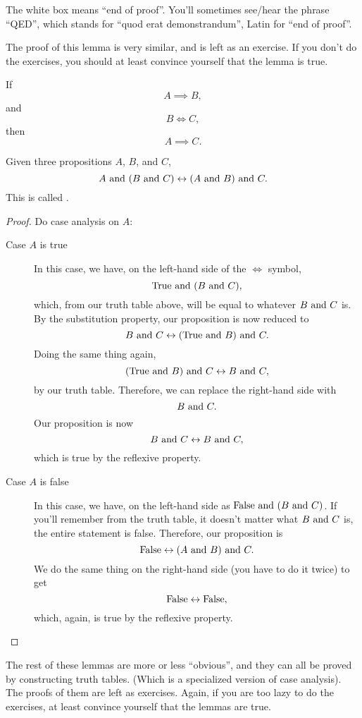 The white box means ``end of proof''. You'll sometimes see/hear the
phrase ``QED'', which stands for ``quod erat demonstrandum'', Latin
for ``end of proof''.

The proof of this lemma is very similar, and is left as an
exercise. If you don't do the exercises, you should at least convince
yourself that the lemma is true.

\begin{lemma}
  \label{conclusion-substitution}
  If $$A \implies B,$$ and $$B \iff C,$$ then $$A \implies C.$$
\end{lemma}

\begin{lemma}
  Given three propositions $A$, $B$, and $C$,
  $$A \text{ and } (B \text{ and } C) \leftrightarrow (A \text{ and } B) \text{ and } C.$$ This is called
  .
\end{lemma}

\begin{proof}
  Do case analysis on $A$:

  \begin{description}
  \item[Case $A$ is true] In this case, we have, on the left-hand side
    of the $\iff$ symbol, $$\text{True} \text{ and } (B \text{ and } C),$$ which, from our
    truth table above, will be equal to whatever $B \text{ and } C$ is. By
    the substitution property, our proposition is now reduced to
    $$B \text{ and } C \leftrightarrow (\text{True} \text{ and } B) \text{ and } C.$$ Doing the same thing
    again, $$(\text{True} \text{ and } B) \text{ and } C \leftrightarrow B \text{ and } C,$$ by our truth
    table. Therefore, we can replace the right-hand side with
    $$B \text{ and } C.$$ Our proposition is now
    $$B \text{ and } C \leftrightarrow B \text{ and } C,$$ which is true by the reflexive
    property.
  \item[Case $A$ is false] In this case, we have, on the left-hand
    side as $\text{False} \text{ and } (B \text{ and } C)$. If you'll remember from the
    truth table, it doesn't matter what $B \text{ and } C$ is, the entire
    statement is false. Therefore, our proposition is
    $$\text{False} \leftrightarrow (A \text{ and } B) \text{ and } C.$$ We do the same thing on the
    right-hand side (you have to do it twice) to get
    $$\text{False} \leftrightarrow \text{False},$$ which, again, is true by the reflexive property.
  \end{description}
\end{proof}

The rest of these lemmas are more or less ``obvious'', and they can
all be proved by constructing truth tables. (Which is a specialized
version of case analysis). The proofs of them are left as
exercises. Again, if you are too lazy to do the exercises, at least
convince yourself that the lemmas are true.

